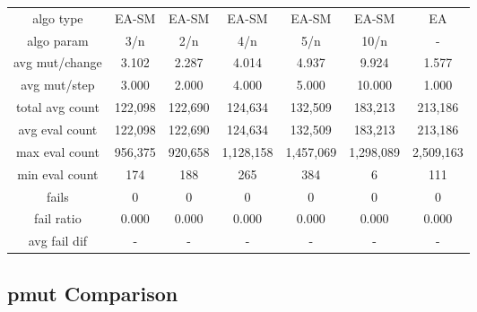 \begin{tabular}[h]{ccccccc}
algo type&            EA-SM&     EA-SM&     EA-SM&     EA-SM&     EA-SM&        EA\\
algo param&             3/n&       2/n&       4/n&       5/n&      10/n&         -\\
avg mut/change&       3.102&     2.287&     4.014&     4.937&     9.924&     1.577\\
avg mut/step&         3.000&     2.000&     4.000&     5.000&    10.000&     1.000\\
\hline
total avg count&    122,098&   122,690&   124,634&   132,509&   183,213&   213,186\\
avg eval count&     122,098&   122,690&   124,634&   132,509&   183,213&   213,186\\
max eval count&     956,375&   920,658& 1,128,158& 1,457,069& 1,298,089& 2,509,163\\
min eval count&         174&       188&       265&       384&         6&       111\\
\hline
fails&                    0&         0&         0&         0&         0&         0\\
fail ratio&           0.000&     0.000&     0.000&     0.000&     0.000&     0.000\\
avg fail dif&             -&         -&         -&         -&         -&         -\\
\end{tabular}


\subsection{pmut Comparison}


